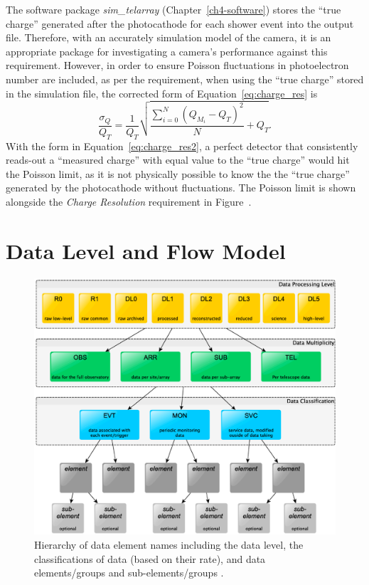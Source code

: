 The software package \textit{sim\_telarray} (Chapter~\ref{ch4-software}) stores the ``true charge'' generated after the photocathode for each shower event into the output file. Therefore, with an accurately simulation model of the camera, it is an appropriate package for investigating a camera's performance against this requirement. However, in order to ensure Poisson fluctuations in photoelectron number are included, as per the requirement, when using the ``true charge'' stored in the simulation file, the corrected form of Equation~\ref{eq:charge_res} is
\begin{equation} \label{eq:charge_res2}
\dfrac{\sigma_Q}{Q_T} = \dfrac{1}{Q_T} \sqrt{\dfrac{\sum_{i=0}^N (Q_{M_i} - Q_T)^2}{N} + Q_T}.
\end{equation}
With the form in Equation~\ref{eq:charge_res2}, a perfect detector that consistently reads-out a ``measured charge'' with equal value to the ``true charge'' would hit the Poisson limit, as it is not physically possible to know the the ``true charge'' generated by the photocathode without fluctuations. The Poisson limit is shown alongside the \textit{Charge Resolution} requirement in Figure~.

\section{Data Level and Flow Model}

\begin{figure}
  \centering\includegraphics[width=\textwidth]{figures/images/high_level_data_model} 
	\caption[High-level Data Model Hierarchy]{Hierarchy of data element names including the data level, the classifications of data (based on their rate), and data elements/groups and sub-elements/groups \cite{Kosack2017}.}
	\label{fig:high_level_data_model}
\end{figure}

